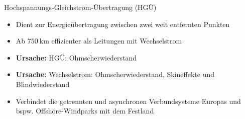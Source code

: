 \documentclass[aspectratio=1610, professionalfonts, 9pt]{beamer}
\begin{document}
\begin{frame}
  \begin{block}{Hochspannungs-Gleichstrom-Übertragung (HGÜ)}
    \begin{itemize}
      \item Dient zur Energieübertragung zwischen zwei weit entfernten Punkten
      \item Ab $\SI{750}{\kilo\meter}$ effizienter als Leitungen mit Wechselstrom
  \item[] \textbf{\textcolor{tugreen}{Ursache:}} HGÜ: Ohmscherwiederstand
  \item[] \textbf{\textcolor{tulight}{Ursache:}} Wechselstrom: Ohmscherwiederstand, Skineffekte und Blindwiederstand
      \item Verbindet die getrennten und asynchronen Verbundsysteme Europas und bspw. Offshore-Windparks mit dem Festland
      \end{itemize}
\end{block}

 \end{frame}
\end{document}
